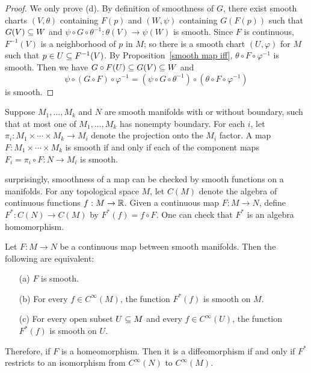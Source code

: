 \begin{proof}
We only prove (d). By definition of smoothness of $G$, there exist smooth charts $(V,\theta)$ containing $F(p)$ and $(W,\psi)$ containing $G(F(p))$ such that $G(V)\subseteq W$ and $\psi\circ G\circ\theta^{-1}:\theta(V)\to\psi(W)$ is smooth. Since $F$ is continuous, $F^{-1}(V)$ is a neighborhood of $p$ in $M$; so there is a smooth chart $(U,\varphi)$ for $M$ such that $p\in U\subseteq F^{-1}(V)$. By Proposition~\ref{smooth map iff}, $\theta\circ F\circ\varphi^{-1}$ is smooth. Then we have $G\circ F(U)\subseteq G(V)\subseteq W$ and
\[\psi\circ(G\circ F)\circ\varphi^{-1}=(\psi\circ G\circ\theta^{-1})\circ(\theta\circ F\circ\varphi^{-1})\]
is smooth.
\end{proof}
\begin{proposition}
Suppose $M_1,\dots,M_k$ and $N$ are smooth manifolds with or without boundary, such that at most one of $M_1,\dots,M_k$ has nonempty boundary. For each $i$, let $\pi_i:M_1\times\cdots\times M_k\to M_i$ denote the projection onto the $M_i$ factor. A map $F:M_1\times\cdots\times M_k$ is smooth if and only if each of the component maps $F_i=\pi_i\circ F:N\to M_i$ is smooth.
\end{proposition}
surprisingly, smoothness of a map can be checked by smooth functions on a manifolds. For any topological space $M$, let $C(M)$ denote the algebra of continuous functions $f:M\to\mathbb{R}$. Given a continuous map $F:M\to N$, define $F^*:C(N)\to C(M)$ by $F^*(f)=f\circ F$. One can check that $F^*$ is an algebra homomorphism.
\begin{proposition}\label{smooth crit by function}
Let $F:M\to N$ be a continuous map between smooth manifolds. Then the following are equivalent:
\begin{itemize}
\item[(a)] $F$ is smooth.
\item[(b)] For every $f\in C^\infty(M)$, the function $F^*(f)$ is smooth on $M$.
\item[(c)] For every open subset $U\subseteq M$ and every $f\in C^\infty(U)$, the function $F^*(f)$ is smooth on $U$.
\end{itemize}
Therefore, if $F$ is a homeomorphism. Then it is a diffeomorphism if and only if $F^*$ restricts to an isomorphism from $C^\infty(N)$ to $C^\infty(M)$.
\end{proposition}
